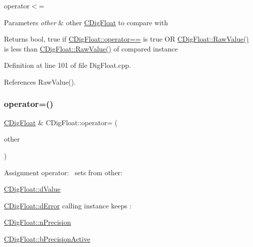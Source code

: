 operator$<$= 


\begin{DoxyParams}{Parameters}
{\em other} & other \hyperlink{classCDigFloat}{C\+Dig\+Float} to compare with \\
\hline
\end{DoxyParams}
\begin{DoxyReturn}{Returns}
bool, true if \hyperlink{classCDigFloat_ad8980d984bf2bab71d15b830fd0180a5}{C\+Dig\+Float\+::operator==} is true OR \hyperlink{classCDigFloat_acb435346b1f7b2e78d8f8373a416533a}{C\+Dig\+Float\+::\+Raw\+Value()} is less than \hyperlink{classCDigFloat_acb435346b1f7b2e78d8f8373a416533a}{C\+Dig\+Float\+::\+Raw\+Value()} of compared instance 
\end{DoxyReturn}


Definition at line 101 of file Dig\+Float.\+cpp.



References Raw\+Value().

\mbox{\label{classCDigFloat_a74f36566c2c79d7258b7b2dee35d46b2}} 
\subsubsection{\texorpdfstring{operator=()}{operator=()}\hspace{0.1cm}{\footnotesize\ttfamily [1/2]}}
{\footnotesize\ttfamily \hyperlink{classCDigFloat}{C\+Dig\+Float} \& C\+Dig\+Float\+::operator= (\begin{DoxyParamCaption}\item[{const \hyperlink{classCDigFloat}{C\+Dig\+Float} \&}]{other }\end{DoxyParamCaption})}



Assignment operator\+:~\newline
 sets from other\+: 


\begin{DoxyItemize}
\item \hyperlink{classCDigFloat_a4bbe69e30dd4e20527362493aa9aaf96}{C\+Dig\+Float\+::d\+Value}
\item \hyperlink{classCDigFloat_a25eb3782d1e727ff007a48f8308e3d4d}{C\+Dig\+Float\+::d\+Error} calling instance keeps \+:
\item \hyperlink{classCDigFloat_ad580654be35246d14c91482581c0bc11}{C\+Dig\+Float\+::n\+Precision}
\item \hyperlink{classCDigFloat_aa1f6ed0312a2aa6ae5ee2abd195adefc}{C\+Dig\+Float\+::b\+Precision\+Active}
\end{DoxyItemize}


